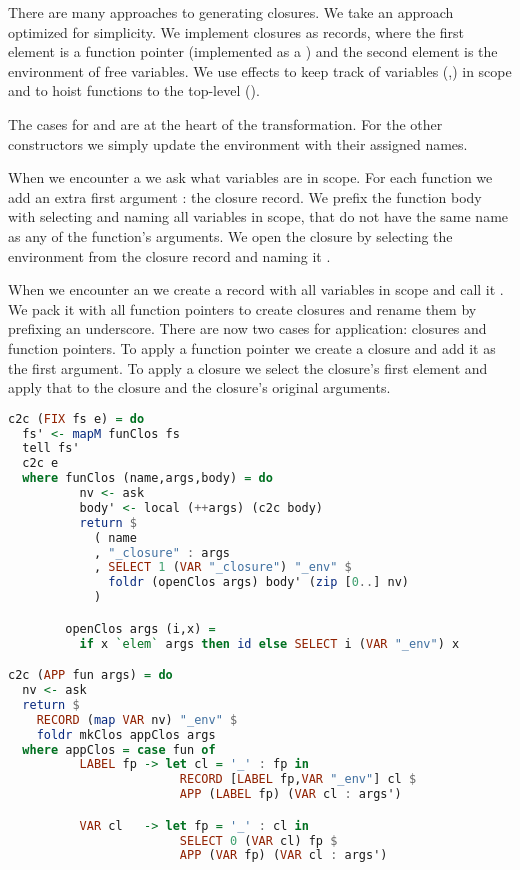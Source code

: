 {There are many approaches to generating closures. We take an approach optimized for simplicity. We implement closures as records, where the first element is a function pointer (implemented as a ) and the second element is the environment of free variables. We use effects to keep track of variables (,) in scope and to hoist functions to the top-level ().

The cases for  and  are at the heart of the transformation. For the other constructors we simply update the environment with their assigned names.

When we encounter a  we ask what variables are in scope. For each function we add an extra first argument : the closure record. We prefix the function body with selecting and naming all variables in scope, that do not have the same name as any of the function's arguments. We open the closure by selecting the environment from the closure record and naming it .

When we encounter an  we create a record with all variables in scope and call it . We pack it with all function pointers to create closures and rename them by prefixing an underscore. There are now two cases for application: closures and function pointers. To apply a function pointer we create a closure and add it as the first argument. To apply a closure we select the closure's first element and apply that to the closure and the closure's original arguments.

\begin{lstlisting}[language=Haskell]
c2c (FIX fs e) = do
  fs' <- mapM funClos fs
  tell fs'
  c2c e
  where funClos (name,args,body) = do
          nv <- ask
          body' <- local (++args) (c2c body)
          return $
            ( name
            , "_closure" : args
            , SELECT 1 (VAR "_closure") "_env" $
              foldr (openClos args) body' (zip [0..] nv)
            )

        openClos args (i,x) =
          if x `elem` args then id else SELECT i (VAR "_env") x

c2c (APP fun args) = do
  nv <- ask
  return $
    RECORD (map VAR nv) "_env" $
    foldr mkClos appClos args
  where appClos = case fun of
          LABEL fp -> let cl = '_' : fp in
                        RECORD [LABEL fp,VAR "_env"] cl $
                        APP (LABEL fp) (VAR cl : args')

          VAR cl   -> let fp = '_' : cl in
                        SELECT 0 (VAR cl) fp $
                        APP (VAR fp) (VAR cl : args')


\end{lstlisting}}
